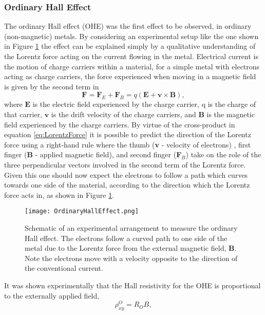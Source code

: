         \subsubsection{Ordinary Hall Effect}\label{subsubsec:OHE}
        The ordinary Hall effect (OHE) was the first effect to be observed, in ordinary (non-magnetic) metals. By considering an experimental setup like the one shown in Figure \ref{fig:OHE} the effect can be explained simply by a qualitative understanding of the Lorentz force acting on the current flowing in the metal. Electrical current is the motion of charge carriers within a material, for a simple metal with electrons acting as charge carriers, the force experienced when moving in a magnetic field is given by the second term in
        \begin{equation}\label{eq:LorentzForce}
	        \textbf{F}= \textbf{F}_{E} + \textbf{F}_{B}  = q(\textbf{E}+\textbf{v}\times\textbf{B}),
        \end{equation}
        where $\textbf{E}$ is the electric field experienced by the charge carrier, q is the charge of that carrier, $\textbf{v}$ is the drift velocity of the charge carriers, and $\textbf{B}$ is the magnetic field experienced by the charge carriers. By virtue of the cross-product in equation \ref{eq:LorentzForce} it is possible to predict the direction of the Lorentz force using a right-hand rule where the thumb (\textbf{v} - velocity of electrons) , first finger (\textbf{B} - applied magnetic field), and second finger (\textbf{F}$_{B}$) take on the role of the three perpendicular vectors involved in the second term of the Lorentz force. Given this one should now expect the electrons to follow a path which curves towards one side of the material, according to the direction which the Lorentz force acts in, as shown in Figure \ref{fig:OHE}.
        \begin{figure}[t]
        	\centering
	        \texttt{[image: OrdinaryHallEffect.png]}
    	    \caption{Schematic of an experimental arrangement to measure the ordinary Hall effect. The electrons follow a curved path to one side of the metal due to the Lorentz force from the external magnetic field, \textbf{B}. Note the electrons move with a velocity opposite to the direction of the conventional current.}
	        \label{fig:OHE}
        \end{figure}
        It was shown experimentally that the Hall resistivity for the OHE is proportional to the externally applied field,
        \begin{equation}\label{eq:OHE}
	       \rho_{xy}^{O} = R_{O}B,
        \end{equation}
